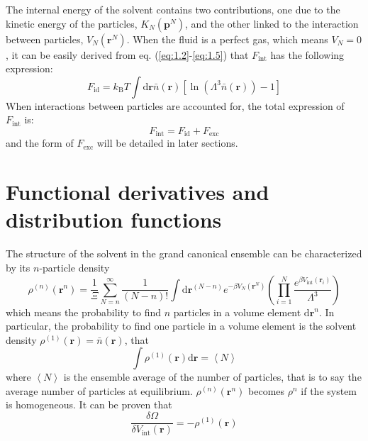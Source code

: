 The internal energy of the solvent contains two contributions, one
due to the kinetic energy of the particles, $K_{N}(\mathbf{p}^{N})$,
and the other linked to the interaction between particles, $V_{N}(\mathbf{r}^{N})$.
When the fluid is a perfect gas, which means $V_{N}=0$, it can be
easily derived from eq. (\ref{eq:1.2}-\ref{eq:1.5}) that $F_{\mathrm{int}}$
has the following expression:
\begin{equation}
F_{\mathrm{id}}=k_{\mathrm{B}}T\int\mathrm{d}\mathbf{r}\bar{n}(\mathbf{r})\left[\ln\left(\Lambda^{3}\bar{n}(\mathbf{r})\right)-1\right]
\end{equation}
When interactions between particles are accounted for, the total expression
of $F_{\mathrm{int}}$ is:
\begin{equation}
F_{\mathrm{int}}=F_{\mathrm{id}}+F_{\mathrm{exc}}\label{eq:f-int-def}
\end{equation}
and the form of $F_{\mathrm{exc}}$ will be detailed in later sections.

\section{Functional derivatives and distribution functions}

The structure of the solvent in the grand canonical ensemble can be
characterized by its $n$-particle density 
\begin{equation}
\rho^{(n)}(\mathbf{r}^{n})=\dfrac{1}{\varXi}\sum_{N=n}^{\infty}\dfrac{1}{(N-n)!}\int\mathrm{d}\mathbf{r}^{\left(N-n\right)}e^{-\beta V_{N}(\mathbf{r}^{N})}\left(\prod_{i=1}^{N}\frac{e^{\beta V_{\mathrm{int}}(\mathbf{r}_{i})}}{\Lambda^{3}}\right)\label{eq:1.def-rho}
\end{equation}
which means the probability to find $n$ particles in a volume element
$\mathrm{d}\mathbf{r}^{n}$. In particular, the probability to find
one particle in a volume element is the solvent density $\rho^{(1)}(\mathbf{r})=\bar{n}(\mathbf{r})$,
that 
\begin{equation}
\int\rho^{(1)}(\mathbf{r})\mathrm{d}\mathbf{r}=\left\langle N\right\rangle 
\end{equation}
where $\left\langle N\right\rangle $ is the ensemble average of the
number of particles, that is to say the average number of particles
at equilibrium. $\rho^{(n)}(\mathbf{r}^{n})$ becomes $\rho^{n}$
if the system is homogeneous. It can be proven that
\begin{equation}
\dfrac{\delta\varOmega}{\delta V_{\mathrm{int}}(\mathbf{r})}=-\rho^{(1)}(\mathbf{r})
\end{equation}


